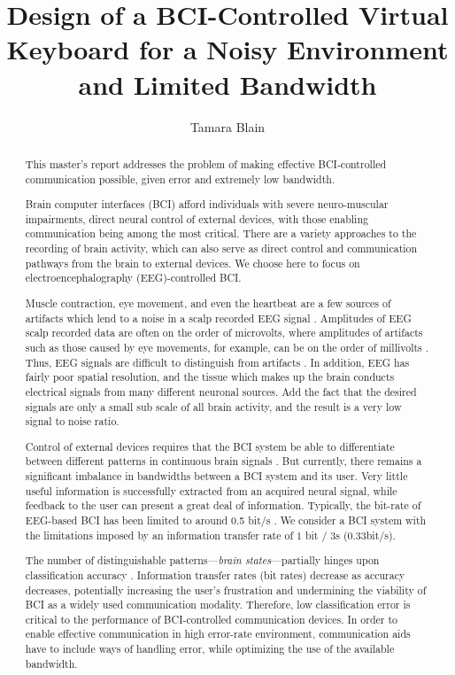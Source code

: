 \documentclass[12pt,titlepage]{article}
\begin{document}
\title{Design of a BCI-Controlled Virtual Keyboard for a Noisy Environment and Limited Bandwidth} %
\author{Tamara Blain}
\maketitle

\begin{abstract}
This master's report addresses the problem of making effective BCI-controlled communication possible, given error and extremely low bandwidth.

Brain computer interfaces (BCI) afford individuals with severe neuro-muscular impairments, direct neural control of external devices, with those enabling communication being among the most critical.  There are a variety approaches to the recording of brain activity, which can also serve as direct control and communication pathways from the brain to external devices.  We choose here to focus on electroencephalography (EEG)-controlled BCI.

Muscle contraction, eye movement, and even the heartbeat are a few sources of artifacts which lend to a noise in a scalp recorded EEG signal \cite{nunez_electric_2005}.  Amplitudes of EEG scalp recorded data are often on the order of microvolts, where amplitudes of artifacts such as those caused by eye movements, for example, can be on the order of millivolts \cite{tatum2007handbook}.  Thus, EEG signals are difficult to distinguish from artifacts \cite{nunez_electric_2005}.  In addition, EEG has fairly poor spatial resolution, and the tissue which makes up the brain conducts electrical signals from many 
different neuronal sources.  Add the fact that the desired signals are only a small sub scale of all 
brain activity, and the result is a very low signal to noise ratio.

Control of external devices requires that the BCI system be able to differentiate between different patterns in continuous brain signals \cite{lotte_review_2007}.  But currently, there remains a significant imbalance in bandwidths between a BCI system and its user.  Very little useful information is successfully extracted from an acquired neural signal, while feedback to the user can present a 
great deal of information.  Typically, the bit-rate of EEG-based BCI has been limited to around 0.5 bit/s \cite{millan2004}.  We consider a BCI system with the limitations imposed by an information transfer rate of $1$ bit $/$ $3$s (0.33bit/s).

The number of distinguishable patterns---\emph{brain states}---partially hinges upon classification 
accuracy \cite{lotte_review_2007}.  Information transfer rates (bit rates) decrease as accuracy decreases, potentially increasing the user's frustration and  undermining the viability of BCI as a widely used communication modality.  Therefore, low classification error is critical to the performance of BCI-controlled communication devices.  In order to enable effective communication in high error-rate environment, communication aids have to include ways of handling error, while optimizing the use of the available bandwidth.


\end{abstract}
\end{document}
